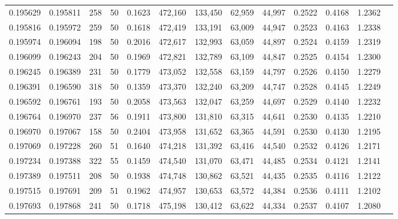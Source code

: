 \begin{tabular}{rrrrrrrrrrrrr}
0.195629 & 0.195811 &   258 &  50 &                                     0.1623 & 472,160 & 133,450 &  62,959 &  44,997 & 0.2522 & 0.4168 & 1.2362 \\
0.195816 & 0.195972 &   259 &  50 &                                     0.1618 & 472,419 & 133,191 &  63,009 &  44,947 & 0.2523 & 0.4163 & 1.2338 \\
0.195974 & 0.196094 &   198 &  50 &                                     0.2016 & 472,617 & 132,993 &  63,059 &  44,897 & 0.2524 & 0.4159 & 1.2319 \\
0.196099 & 0.196243 &   204 &  50 &                                     0.1969 & 472,821 & 132,789 &  63,109 &  44,847 & 0.2525 & 0.4154 & 1.2300 \\
0.196245 & 0.196389 &   231 &  50 &                                     0.1779 & 473,052 & 132,558 &  63,159 &  44,797 & 0.2526 & 0.4150 & 1.2279 \\
0.196391 & 0.196590 &   318 &  50 &                                     0.1359 & 473,370 & 132,240 &  63,209 &  44,747 & 0.2528 & 0.4145 & 1.2249 \\
0.196592 & 0.196761 &   193 &  50 &                                     0.2058 & 473,563 & 132,047 &  63,259 &  44,697 & 0.2529 & 0.4140 & 1.2232 \\
0.196764 & 0.196970 &   237 &  56 &                                     0.1911 & 473,800 & 131,810 &  63,315 &  44,641 & 0.2530 & 0.4135 & 1.2210 \\
0.196970 & 0.197067 &   158 &  50 &                                     0.2404 & 473,958 & 131,652 &  63,365 &  44,591 & 0.2530 & 0.4130 & 1.2195 \\
0.197069 & 0.197228 &   260 &  51 &                                     0.1640 & 474,218 & 131,392 &  63,416 &  44,540 & 0.2532 & 0.4126 & 1.2171 \\
0.197234 & 0.197388 &   322 &  55 &                                     0.1459 & 474,540 & 131,070 &  63,471 &  44,485 & 0.2534 & 0.4121 & 1.2141 \\
0.197389 & 0.197511 &   208 &  50 &                                     0.1938 & 474,748 & 130,862 &  63,521 &  44,435 & 0.2535 & 0.4116 & 1.2122 \\
0.197515 & 0.197691 &   209 &  51 &                                     0.1962 & 474,957 & 130,653 &  63,572 &  44,384 & 0.2536 & 0.4111 & 1.2102 \\
0.197693 & 0.197868 &   241 &  50 &                                     0.1718 & 475,198 & 130,412 &  63,622 &  44,334 & 0.2537 & 0.4107 & 1.2080 \\

\end{tabular}
